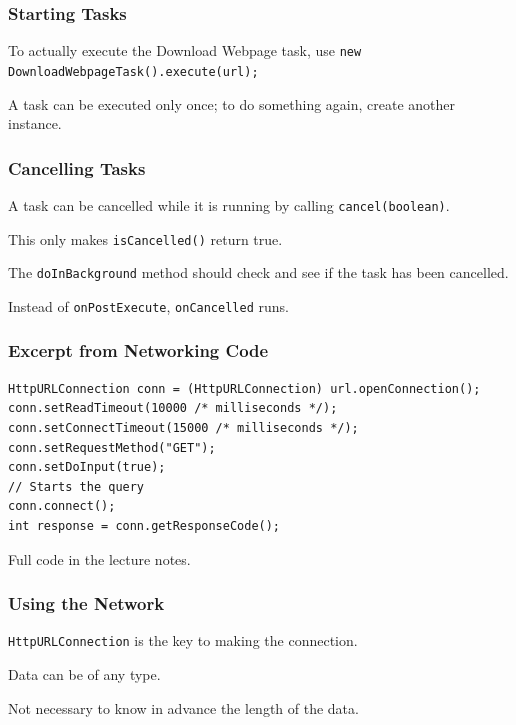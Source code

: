 \begin{frame}
\frametitle{Starting Tasks}

\begin{changemargin}{1cm}
To actually execute the Download Webpage task, use \texttt{new DownloadWebpageTask().execute(url);}

A task can be executed only once; to do something again, create another instance.

\end{changemargin}
\end{frame}

\begin{frame}
\frametitle{Cancelling Tasks}

\begin{changemargin}{1cm}
A task can be cancelled while it is running by calling \texttt{cancel(boolean)}.

This only makes \texttt{isCancelled()} return true.

The \texttt{doInBackground} method should check and see if the task has been cancelled.

Instead of \texttt{onPostExecute}, \texttt{onCancelled} runs.

\end{changemargin}
\end{frame}


\begin{frame}[fragile]
\frametitle{Excerpt from Networking Code}


{\scriptsize
\begin{verbatim}
HttpURLConnection conn = (HttpURLConnection) url.openConnection();
conn.setReadTimeout(10000 /* milliseconds */);
conn.setConnectTimeout(15000 /* milliseconds */);
conn.setRequestMethod("GET");
conn.setDoInput(true);
// Starts the query
conn.connect();
int response = conn.getResponseCode();
\end{verbatim}
}

Full code in the lecture notes.
\end{frame}

\begin{frame}
\frametitle{Using the Network}

\begin{changemargin}{1cm}

\texttt{HttpURLConnection} is the key to making the connection. 

Data can be of any type. 

Not necessary to know in advance the length of the data. 


\end{changemargin}
\end{frame}

